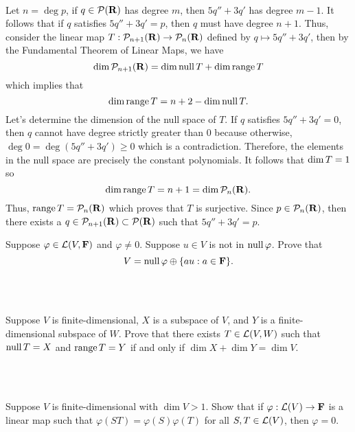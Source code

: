 \begin{solution}
    \\ Let $n = \deg p$, if $q \in \mathcal{P}(\mathbf{R})$ has degree $m$, then $5q'' + 3q'$ has degree $m-1$. It follows that if $q$ satisfies $5q'' + 3q' = p$, then $q$ must have degree $n+1$. Thus, consider the linear map $T : \mathcal{P}_{n+1}(\mathbf{R}) \to \mathcal{P}_n(\mathbf{R})$ defined by $q \mapsto 5q'' + 3q'$, then by the Fundamental Theorem of Linear Maps, we have
    $$\dim \mathcal{P}_{n+1}(\mathbf{R}) = \dim \operatorname{\text{null}} T + \dim \operatorname{\text{range}} T$$
    which implies that
    $$\dim \operatorname{\text{range}} T = n+2 - \dim \operatorname{\text{null}} T.$$
    Let's determine the dimension of the null space of $T$. If $q$ satisfies $5q'' + 3q' = 0$, then $q$ cannot have degree strictly greater than 0 because otherwise, $\deg 0 = \deg (5q'' + 3q') \geq 0$ which is a contradiction. Therefore, the elements in the null space are precisely the constant polynomials. It follows that $\dim \null T = 1$ so
    $$\dim \operatorname{\text{range}} T = n+1 = \dim \mathcal{P}_n(\mathbf{R}).$$
    Thus, $\operatorname{\text{range}} T = \mathcal{P}_n(\mathbf{R})$ which proves that $T$ is surjective. Since $p \in \mathcal{P}_n(\mathbf{R})$, then there exists a $q \in \mathcal{P}_{n+1}(\mathbf{R}) \subset \mathcal{P}(\mathbf{R})$ such that $5q'' + 3q' = p$. \\
\end{solution}

\begin{exercise}
    Suppose $\varphi \in \mathcal{L}(V, \mathbf{F})$ and $\varphi \neq 0$. Suppose $u \in V$ is not in $\operatorname{\text{null}} \varphi$. Prove that
    $$V = \operatorname{\text{null}} \varphi \oplus \{au : a \in \mathbf{F}\}.$$
\end{exercise}

\begin{solution}
    \\ \td \\
\end{solution}

\begin{exercise}
    Suppose $V$ is finite-dimensional, $X$ is a subspace of $V$, and $Y$ is a finite-dimensional subspace of $W$. Prove that there exists $T \in \mathcal{L}(V,W)$ such that $\operatorname{\text{null}} T = X$ and $\operatorname{\text{range}} T = Y$ if and only if $\dim X + \dim Y = \dim V$. \\
\end{exercise}

\begin{solution}
    \\ \td \\
\end{solution}

\begin{exercise}
    Suppose $V$ is finite-dimensional with $\dim V > 1$. Show that if $\varphi : \mathcal{L}(V) \to \mathbf{F}$ is a linear map such that $\varphi(ST) = \varphi(S) \varphi(T)$ for all $S,T \in \mathcal{L}(V)$, then $\varphi = 0$.  \\
\end{exercise}

